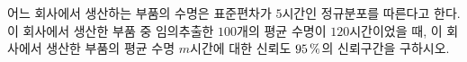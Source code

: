 어느 회사에서 생산하는 부품의 수명은 표준편차가 $5$시간인 정규분포를 따른다고 한다. 이 회사에서 생산한 부품 중 임의추출한 $100$개의 평균 수명이 $120$시간이었을 때, 이 회사에서 생산한 부품의 평균 수명 $m$시간에 대한 신뢰도 $95\mkern3mu \%$의 신뢰구간을 구하시오. 
